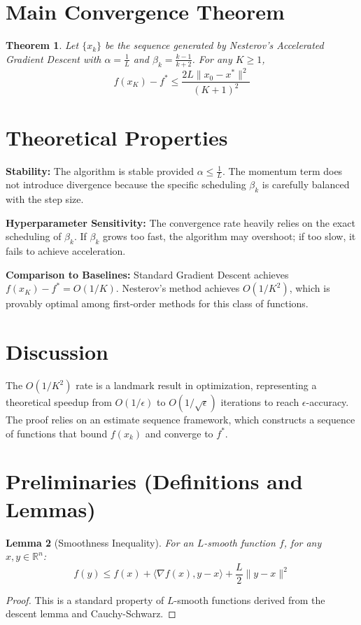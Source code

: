 \documentclass{article}
\newtheorem{theorem}{Theorem}
\newtheorem{lemma}[theorem]{Lemma}
\begin{document}
\section*{Main Convergence Theorem}
\begin{theorem}
Let $\{x_k\}$ be the sequence generated by Nesterov's Accelerated Gradient Descent with $\alpha = \frac{1}{L}$ and $\beta_k = \frac{k-1}{k+2}$. For any $K \geq 1$,
$$f(x_K) - f^* \leq \frac{2L \|x_0 - x^*\|^2}{(K+1)^2}$$
\end{theorem}

\section*{Theoretical Properties}
\textbf{Stability:} The algorithm is stable provided $\alpha \leq \frac{1}{L}$. The momentum term does not introduce divergence because the specific scheduling $\beta_k$ is carefully balanced with the step size.

\textbf{Hyperparameter Sensitivity:} The convergence rate heavily relies on the exact scheduling of $\beta_k$. If $\beta_k$ grows too fast, the algorithm may overshoot; if too slow, it fails to achieve acceleration.

\textbf{Comparison to Baselines:} Standard Gradient Descent achieves $f(x_K) - f^* = O(1/K)$. Nesterov's method achieves $O(1/K^2)$, which is provably optimal among first-order methods for this class of functions.

\section*{Discussion}
The $O(1/K^2)$ rate is a landmark result in optimization, representing a theoretical speedup from $O(1/\epsilon)$ to $O(1/\sqrt{\epsilon})$ iterations to reach $\epsilon$-accuracy. The proof relies on an estimate sequence framework, which constructs a sequence of functions that bound $f(x_k)$ and converge to $f^*$.

\section*{Preliminaries (Definitions and Lemmas)}
\begin{lemma}[Smoothness Inequality]
For an $L$-smooth function $f$, for any $x, y \in \mathbb{R}^n$:
$$f(y) \leq f(x) + \langle \nabla f(x), y - x \rangle + \frac{L}{2} \|y - x\|^2$$
\end{lemma}
\begin{proof}
This is a standard property of $L$-smooth functions derived from the descent lemma and Cauchy-Schwarz.
\end{proof}
\end{document}
